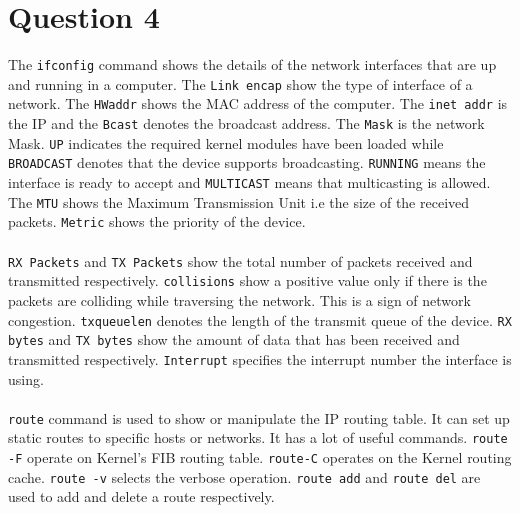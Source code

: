 \documentclass{article}
\begin{document}
	\section*{Question 4}
	The \texttt{ifconfig} command shows the details of the network interfaces that are up and running in a computer.
	The \texttt{Link encap} show the type of interface of a network. The \texttt{HWaddr} shows the MAC address of the computer.
	The \texttt{inet addr} is the IP and the \texttt{Bcast} denotes the broadcast address. The \texttt{Mask} is the network Mask. \texttt{UP} indicates the required kernel modules have been loaded while \texttt{BROADCAST} denotes that the device supports broadcasting. \texttt{RUNNING} means the interface is ready to accept and \texttt{MULTICAST} means that multicasting is allowed. The \texttt{MTU} shows the Maximum Transmission Unit i.e the size of the received packets. \texttt{Metric} shows the priority of the device. 

	\paragraph{} \texttt{RX Packets} and \texttt{TX Packets} show the total number of packets received and transmitted respectively. \texttt{collisions} show a positive value only if there is the packets are colliding while traversing the network. This is a sign of network congestion. \texttt{txqueuelen} denotes the length of the transmit queue of the device. \texttt{RX bytes} and \texttt{TX bytes} show the amount of data that has been received and transmitted respectively. \texttt{Interrupt} specifies the interrupt number the interface is using.

	\paragraph{} \texttt{route} command is used to show or manipulate the IP routing table. It can set up static routes to specific hosts or networks. It has a lot of useful commands. \texttt{route -F} operate on Kernel's FIB routing table. \texttt{route-C} operates on the Kernel routing cache. \texttt{route -v} selects the verbose operation. \texttt{route add} and \texttt{route del} are used to add and delete a route respectively. 

\end{document}
